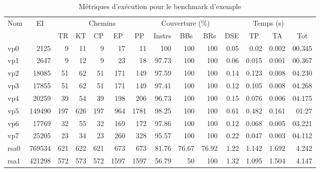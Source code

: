                 \begin{table}[p]
                    \scriptsize
                    \caption{Métriques d'exécution pour le benchmark d'exemple}\label{tbl:ch3:exp:fissc-time}
                    \begin{center}
                    \setlength\tabcolsep{2pt} 
                    \begin{tabular}{l|r|r|r|r|r|r|r|r|r|r|r|r|r}
                    \multicolumn{1}{c|}{\multirow{2}{*}{Nom}} & \multicolumn{1}{c|}{\multirow{2}{*}{EI}} & \multicolumn{5}{c|}{Chemins} & \multicolumn{3}{c|}{Couverture (\%)} & \multicolumn{4}{c}{Temps (s)} \\
                    \multicolumn{1}{c|}{} & \multicolumn{1}{c|}{} & \multicolumn{1}{c}{TR} & \multicolumn{1}{c}{KT} & \multicolumn{1}{c}{CP} & \multicolumn{1}{c}{EP} & \multicolumn{1}{c|}{PP} & \multicolumn{1}{c}{Instrs} & \multicolumn{1}{c}{BBs} & \multicolumn{1}{c|}{BRs} & \multicolumn{1}{c}{DSE} & \multicolumn{1}{c}{TP} & \multicolumn{1}{c}{TA} & \multicolumn{1}{c}{Tot} \\
                    \hline
                    \hline
                    vp0 & 2125 & 9 & 11 & 9 & 17 & 11 & 100 & 100 & 100 & 0.05 & 0.02 & 0.002 & 00.345 \\
                    vp1 & 2647 & 9 & 12 & 9 & 23 & 18 & 97.73 & 100 & 100 & 0.06 & 0.015 & 0.001 & 00.367 \\
                    vp2 & 18085 & 51 & 62 & 51 & 171 & 149 & 97.59 & 100 & 100 & 0.14 & 0.123 & 0.008 & 04.230 \\
                    vp3 & 17855 & 51 & 62 & 51 & 171 & 149 & 97.41 & 100 & 100 & 0.12 & 0.105 & 0.008 & 04.268 \\
                    vp4 & 20259 & 39 & 54 & 39 & 198 & 206 & 96.73 & 100 & 100 & 0.15 & 0.076 & 0.006 & 04.175 \\
                    vp5 & 149490 & 197 & 626 & 197 & 964 & 1781 & 98.25 & 100 & 100 & 0.61 & 0.482 & 0.161 & 01:27 \\
                    vp6 & 17769 & 32 & 55 & 32 & 169 & 172 & 97.86 & 100 & 100 & 0.12 & 0.068 & 0.005 & 03.221 \\
                    vp7 & 25205 & 23 & 34 & 23 & 260 & 328 & 95.57 & 100 & 100 & 0.22 & 0.047 & 0.003 & 04.112 \\
                    rsa0 & 769534 & 621 & 622 & 621 & 673 & 673 & 81.76 & 76.67 & 76.92 & 1.22 & 1.142 & 1.692 & 4.242 \\
                    rsa1 & 421298 & 572 & 573 & 572 & 1597 & 1597 & 56.79 & 50 & 100 & 1.32 & 1.095 & 1.504 & 4.147 \\

\end{tabular}
\end{center}
\end{table}
